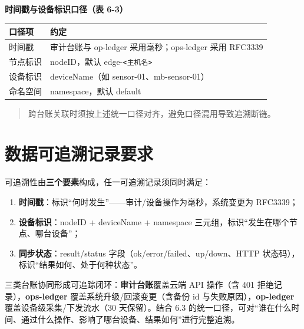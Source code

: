 \textbf{时间戳与设备标识口径（表 6-3）}

\begin{tabular}{ll}
\toprule
口径项 & 约定\\
\midrule
时间戳 & 审计台账与 op-ledger 采用毫秒；ops-ledger 采用 RFC3339\\
节点标识 & nodeID，默认 edge-\texttt{<主机名>}\\
设备标识 & deviceName（如 sensor-01、mb-sensor-01）\\
命名空间 & namespace，默认 default\\
\bottomrule
\end{tabular}

\begin{quote}
跨台账关联时须按上述统一口径对齐，避免口径混用导致追溯断链。
\end{quote}

\section{数据可追溯记录要求}

可追溯性由\textbf{三个要素}构成，任一可追溯记录须同时满足：

\begin{enumerate}
  \item \textbf{时间戳}：标识“何时发生”——审计/设备操作为毫秒，系统变更为 RFC3339；
  \item \textbf{设备标识}：nodeID + deviceName + namespace 三元组，标识“发生在哪个节点、哪台设备”；
  \item \textbf{同步状态}：result/status 字段（ok/error/failed、up/down、HTTP 状态码），标识“结果如何、处于何种状态”。
\end{enumerate}

三类台账协同形成可追踪闭环：\textbf{审计台账}覆盖云端 API 操作（含 401 拒绝记录），\textbf{ops-ledger} 覆盖系统升级/回滚变更（含备份 id 与失败原因），\textbf{op-ledger} 覆盖设备级采集/下发流水（30 天保留）。结合 6.3 的统一口径，可对“谁在什么时间、通过什么操作、影响了哪台设备、结果如何”进行完整追溯。
